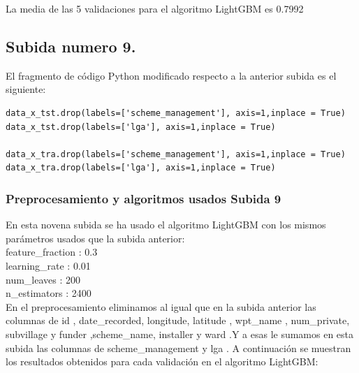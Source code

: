 	La media de las 5 validaciones para el algoritmo LightGBM es 0.7992 \\

	
	\subsection[Subida numero 9]{Subida numero 9.}
	
	El fragmento de código Python modificado respecto a la anterior subida es el siguiente:
	
	\lstset{language=python}
	\begin{lstlisting}[frame=single]
data_x_tst.drop(labels=['scheme_management'], axis=1,inplace = True)
data_x_tst.drop(labels=['lga'], axis=1,inplace = True)

data_x_tra.drop(labels=['scheme_management'], axis=1,inplace = True)
data_x_tra.drop(labels=['lga'], axis=1,inplace = True)
	\end{lstlisting}
	
	
	\subsubsection[Preprocesamiento y algoritmos usados Subida 9]{Preprocesamiento y algoritmos usados Subida 9}
	
	En esta novena subida se ha usado el algoritmo LightGBM con los mismos
	parámetros usados que la subida anterior: \\
	
	feature\_fraction : 0.3 \\
	learning\_rate : 0.01 \\
	num\_leaves : 200 \\
	n\_estimators : 2400 \\
	
	En el preprocesamiento eliminamos al igual que en la subida anterior las columnas de id , date\_recorded,
	longitude, latitude , wpt\_name , num\_private, subvillage y funder ,scheme\_name, installer y ward .Y a esas le sumamos en esta subida las 
	columnas de scheme\_management y lga . A continuación se muestran los resultados 
	obtenidos para cada validación en el algoritmo LightGBM: \\

